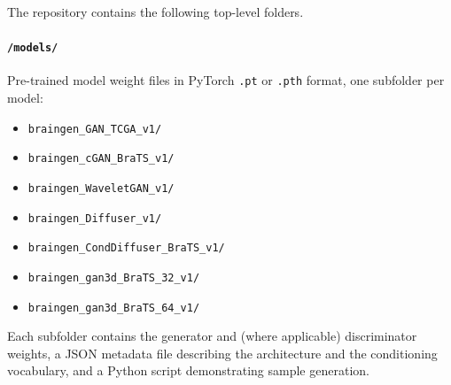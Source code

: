 %


The repository contains the following top-level folders.

\paragraph{\texttt{/models/}} Pre-trained model weight files in PyTorch \texttt{.pt} or
\texttt{.pth} format, one subfolder per model:
\begin{itemize}
  \item \texttt{braingen\_GAN\_TCGA\_v1/}
  \item \texttt{braingen\_cGAN\_BraTS\_v1/}
  \item \texttt{braingen\_WaveletGAN\_v1/}
  \item \texttt{braingen\_Diffuser\_v1/}
  \item \texttt{braingen\_CondDiffuser\_BraTS\_v1/}  %
  \item \texttt{braingen\_gan3d\_BraTS\_32\_v1/}
  \item \texttt{braingen\_gan3d\_BraTS\_64\_v1/}
\end{itemize}
Each subfolder contains the generator and (where applicable) discriminator weights, a JSON
metadata file describing the architecture and the conditioning vocabulary, and a Python
script demonstrating sample generation.

